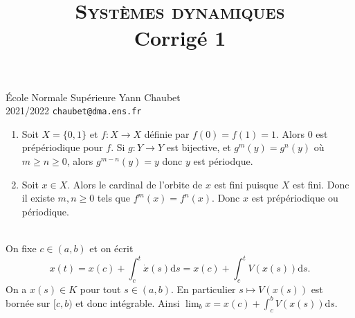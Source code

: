 \documentclass[a4paper,12pt,openany]{article}
\title{\textsc{Syst\`emes dynamiques} \\ Corrig\'e 1}
\date{}
\author{}
\theoremstyle{plain}
\theoremstyle{definition}
\newcommand{\dd}{\mathrm{d}}
\begin{document}
{\noindent \'Ecole Normale Sup\'erieure  \hfill Yann Chaubet } \\
{2021/2022 \hfill \texttt{chaubet@dma.ens.fr}}

{\let\newpage\relax\maketitle}
\maketitle
{} 

{\begin{enumerate}
\item Soit $X = \{0, 1\}$ et $f : X \to X$ d\'efinie par $f(0) = f(1) = 1$. Alors $0$ est pr\'ep\'eriodique pour $f$. Si $g : Y \to Y$ est bijective, et $g^m(y) = g^n(y)$ o\`u $m \geq n \geq 0$, alors $g^{m-n}(y) = y$ donc $y$ est p\'eriodque.
\item Soit $x \in X$. Alors le cardinal de l'orbite de $x$ est fini puisque $X$ est fini. Donc il existe $m, n \geq 0$ tels que $f^m(x) = f^n(x)$. Donc $x$ est pr\'ep\'eriodique ou p\'eriodique. 
\end{enumerate}
}
\hfill \break 

 \\

\noindent On fixe $c \in (a,b)$ et on \'ecrit 
$$
x(t) = x(c) + \int_c^t \dot x(s) \dd s = x(c) + \int_c^t V(x(s)) \dd s.
$$
On a $x(s) \in K$ pour tout $s \in (a,b)$. En particulier $s \mapsto V(x(s))$ est born\'ee sur $[c,b)$ et donc int\'egrable. Ainsi
$
\lim_b x = x(c) + \int_c^b V(x(s)) \dd s.
$
\hfill \break \\

 \\ 
\end{document}
